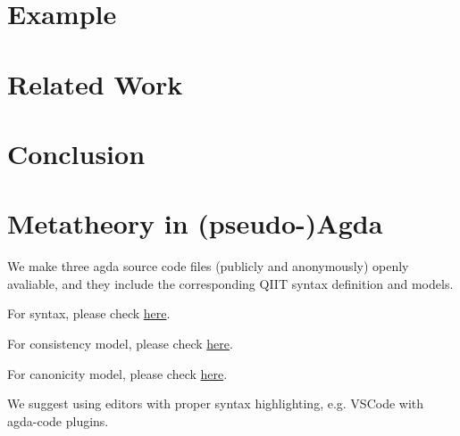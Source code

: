 \label{sec:metatheory}





\section{Example}\label{sec:coqexample}


\section{Related Work}\label{sec:related-work}


\section{Conclusion}
\label{sec:conclusion}

\setlength{\bibsep}{.8ex}



\appendix

\section{Metatheory in (pseudo-)Agda}
We make three agda source code files (publicly and anonymously) openly avaliable, and they include the corresponding QIIT syntax definition and models. 

For syntax, please check \href{https://drive.google.com/file/d/1aoG67rmXzP_x1MvZCIN3do0sucyqjwkn/view?usp=sharing}{here}.

For consistency model, please check \href{https://drive.google.com/file/d/1pNhnn125P5byAHDaSIlpbxMvr1F-9FRo/view?usp=sharing}{here}.

For canonicity model, please check \href{https://drive.google.com/file/d/1R6C7QNfyu8fbl6LE2ruvpqZ_ZDSRVo0c/view?usp=sharing}{here}.

We suggest using editors with proper syntax highlighting, e.g. VSCode with agda-code plugins.